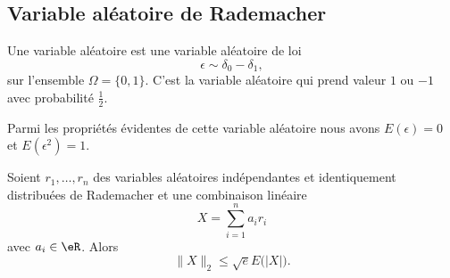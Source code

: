 \subsection{Variable aléatoire de Rademacher}

Une variable aléatoire  est une variable aléatoire de loi
\begin{equation}   
    \epsilon\sim \delta_0-\delta_1,
\end{equation}
sur l'ensemble \( \Omega=\{ 0,1 \}\). C'est la variable aléatoire qui prend valeur \( 1\) ou \( -1\) avec probabilité \( \frac{ 1 }{2}\). 

Parmi les propriétés évidentes de cette variable aléatoire nous avons \( E(\epsilon)=0\) et \( E(\epsilon^2)=1\).

\begin{proposition}  \label{PropCZRNRsf}
    Soient \( r_1,\ldots, r_n\) des variables aléatoires indépendantes et identiquement distribuées de Rademacher et une combinaison linéaire
    \begin{equation}
        X=\sum_{i=1}^na_ir_i
    \end{equation}
    avec \( a_i\in \eR\). Alors
    \begin{equation}    \label{EqYBZlMga}
        \| X \|_2\leq \sqrt{e}E\big( |X| \big).
    \end{equation}
\end{proposition}

